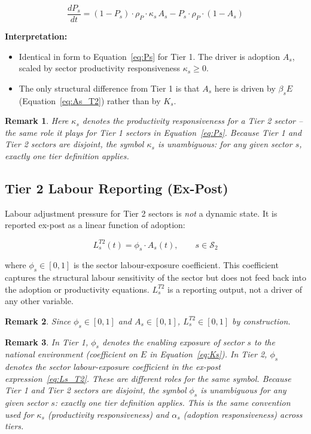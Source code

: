 \documentclass[11pt,a4paper]{article}
\newtheorem{remark}{Remark}
\begin{document}
\begin{equation}
\boxed{
\frac{dP_s}{dt}
= (1 - P_s)\cdot\rho_P\cdot\kappa_s\, A_s
- P_s\cdot\rho_P\cdot(1 - A_s)
}
\label{eq:Ps_T2}
\end{equation}

\textbf{Interpretation:}
\begin{itemize}
  \item Identical in form to Equation~\eqref{eq:Ps} for Tier 1. The driver is adoption $A_s$, scaled by sector productivity responsiveness $\kappa_s \geq 0$.
  \item The only structural difference from Tier 1 is that $A_s$ here is driven by $\beta_s E$ (Equation~\eqref{eq:As_T2}) rather than by $K_s$.
\end{itemize}

\begin{remark}
Here $\kappa_s$ denotes the productivity responsiveness for a Tier 2 sector -- the same role it plays for Tier 1 sectors in Equation~\eqref{eq:Ps}. Because Tier 1 and Tier 2 sectors are disjoint, the symbol $\kappa_s$ is unambiguous: for any given sector $s$, exactly one tier definition applies.
\end{remark}

\subsection{Tier 2 Labour Reporting (Ex-Post)}

Labour adjustment pressure for Tier 2 sectors is \emph{not} a dynamic state. It is reported ex-post as a linear function of adoption:

\begin{equation}
L_s^{T2}(t) = \phi_s\cdot A_s(t), \qquad s \in \mathcal{S}_2
\label{eq:Ls_T2}
\end{equation}

where $\phi_s \in [0,1]$ is the sector labour-exposure coefficient. This coefficient captures the structural labour sensitivity of the sector but does not feed back into the adoption or productivity equations. $L_s^{T2}$ is a reporting output, not a driver of any other variable.

\begin{remark}
Since $\phi_s \in [0,1]$ and $A_s \in [0,1]$, $L_s^{T2} \in [0,1]$ by construction.
\end{remark}

\begin{remark}
In Tier 1, $\phi_s$ denotes the enabling exposure of sector $s$ to the national environment (coefficient on $E$ in Equation~\eqref{eq:Ks}). In Tier 2, $\phi_s$ denotes the sector labour-exposure coefficient in the ex-post expression~\eqref{eq:Ls_T2}. These are different roles for the same symbol. Because Tier 1 and Tier 2 sectors are disjoint, the symbol $\phi_s$ is unambiguous for any given sector $s$: exactly one tier definition applies. This is the same convention used for $\kappa_s$ (productivity responsiveness) and $\alpha_s$ (adoption responsiveness) across tiers.
\end{remark}
\end{document}
